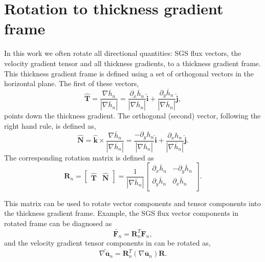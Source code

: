 \documentclass[draft]{agujournal2019}
\begin{document}
\section{Rotation to thickness gradient frame}
\label{app:frame_rotate}
In this work we often rotate all directional quantities: SGS flux vectors, the velocity gradient tensor and all thickness gradients, to a thickness gradient frame. 
This thickness gradient frame is defined using a set of orthogonal vectors in the horizontal plane. The first of these vectors,
\begin{equation}
    \hat{\mathbf{T}} = \frac{\nabla \overline{h}_n}{|\nabla \overline{h}_n|} = \frac{\partial_x \overline{h}_n}{|\nabla \overline{h}_n|} \mathbf{\hat{i}} + \frac{\partial_y \overline{h}_n}{|\nabla \overline{h}_n|} \mathbf{\hat{j}},
\end{equation}
points down the thickness gradient. The orthogonal (second) vector, following the right hand rule, is defined as, 
\begin{equation}
    \hat{\mathbf{N}} = \mathbf{\hat{k}} \times \frac{\nabla \overline{h}_n}{|\nabla \overline{h}_n|} = \frac{-\partial_y h_n}{|\nabla \overline{h}_n|} \mathbf{\hat{i}} + \frac{\partial_x h_n}{|\nabla \overline{h}_n|} \mathbf{\hat{j}}.
\end{equation}
The corresponding rotation matrix is defined as
\begin{equation}
    \mathbf{R}_n = 
    \begin{bmatrix}
        \hat{\mathbf{T}} & \hat{\mathbf{N}}
    \end{bmatrix} = 
    \frac{1}{|\nabla \overline{h}_n|}
    \begin{bmatrix}
        \partial_x \overline{h}_n & - \partial_y \overline{h}_n \\
        \partial_y \overline{h}_n & \partial_x \overline{h}_n \\
    \end{bmatrix}.
\end{equation} 

This matrix can be used to rotate vector components and tensor components into the thickness gradient frame. Example, the SGS flux vector components in rotated frame can be diagnosed as 
\begin{equation}
    \widetilde{\mathbf{F}_n} = \mathbf{R}_n^T \mathbf{F}_n,
    \label{eqn:vec_rot}
\end{equation}
and the velocity gradient tensor components in  can be rotated as, 
\begin{equation}
    \widetilde{\nabla \overline{\mathbf{u}}_n} = \mathbf{R}_n^T (\nabla \overline{\mathbf{u}}_n) \mathbf{R}.
\end{equation}
\end{document}
